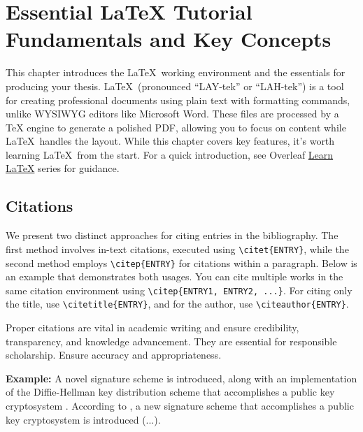 \chapter[Essential LaTeX Tutorial: Fundamentals and Key Concepts]{Essential LaTeX Tutorial Fundamentals and Key Concepts}
\label{cp:latex-tutorial}

This chapter introduces the \LaTeX~working environment and the essentials for producing your thesis. \LaTeX~(pronounced ``LAY-tek'' or ``LAH-tek'') is a tool for creating professional documents using plain text with formatting commands, unlike WYSIWYG editors like Microsoft Word. These files are processed by a TeX engine to generate a polished PDF, allowing you to focus on content while \LaTeX~handles the layout. While this chapter covers key features, it's worth learning \LaTeX~from the start. For a quick introduction, see Overleaf \href{https://www.overleaf.com/learn/latex/Learn_LaTeX_in_30_minutes}{Learn LaTeX} series for guidance.

\section{Citations}
\label{sec:citations}
We present two distinct approaches for citing entries in the bibliography. The first method involves in-text citations, executed using \verb|\citet{ENTRY}|, while the second method employs \verb|\citep{ENTRY}| for citations within a paragraph. Below is an example that demonstrates both usages. You can cite multiple works in the same citation environment using \verb|\citep{ENTRY1, ENTRY2, ...}|. For citing only the title, use \verb|\citetitle{ENTRY}|, and for the author, use \verb|\citeauthor{ENTRY}|.

\begin{block}[tip]
Proper citations are vital in academic writing and ensure credibility, transparency, and knowledge advancement. They are essential for responsible scholarship. Ensure accuracy and appropriateness.
\end{block}

\noindent\textbf{Example:} A novel signature scheme is introduced, along with an implementation of the Diffie-Hellman key distribution scheme that accomplishes a public key cryptosystem \citep{Elgamal1985}. According to \citet{Elgamal1985}, a new signature scheme that accomplishes a public key cryptosystem is introduced (...).

